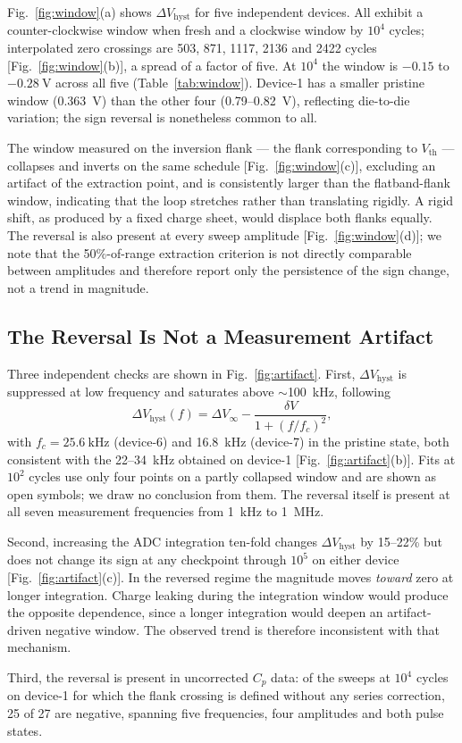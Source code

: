 \documentclass[journal]{IEEEtran}
\newcommand{\rev}[1]{#1}                    %
\newcommand{\Vth}{V_{\mathrm{th}}}
\newcommand{\dVh}{\Delta V_{\mathrm{hyst}}}
\begin{document}
\rev{Fig.~\ref{fig:window}(a) shows $\dVh$ for five independent devices.
All exhibit a counter-clockwise window when fresh and a clockwise window
by $10^4$ cycles; interpolated zero crossings are 503, 871, 1117, 2136
and 2422 cycles [Fig.~\ref{fig:window}(b)], a spread of a factor of
five. At $10^4$ the window is $-0.15$ to $-\SI{0.28}{\volt}$ across all
five (Table~\ref{tab:window}). Device-1 has a smaller pristine window
(\SI{0.363}{\volt}) than the other four (0.79--\SI{0.82}{\volt}),
reflecting die-to-die variation; the sign reversal is nonetheless common
to all.}

\rev{The window measured on the inversion flank --- the flank
corresponding to $\Vth$ --- collapses and inverts on the same schedule
[Fig.~\ref{fig:window}(c)], excluding an artifact of the extraction
point, and is consistently larger than the flatband-flank window,
indicating that the loop stretches rather than translating rigidly. A
rigid shift, as produced by a fixed charge sheet, would displace both
flanks equally. The reversal is also present at every sweep amplitude
[Fig.~\ref{fig:window}(d)]; we note that the 50\%-of-range extraction
criterion is not directly comparable between amplitudes and therefore
report only the persistence of the sign change, not a trend in
magnitude.}

\rev{\subsection{The Reversal Is Not a Measurement Artifact}
Three independent checks are shown in Fig.~\ref{fig:artifact}. First,
$\dVh$ is suppressed at low frequency and saturates above
$\sim$\SI{100}{\kilo\hertz}, following}
\begin{equation}
\dVh(f) = \Delta V_\infty - \frac{\delta V}{1+(f/f_c)^{2}},
\label{eq:debye}
\end{equation}
\rev{with $f_c=\SI{25.6}{\kilo\hertz}$ (device-6) and
\SI{16.8}{\kilo\hertz} (device-7) in the pristine state, both consistent
with the 22--\SI{34}{\kilo\hertz} obtained on device-1
[Fig.~\ref{fig:artifact}(b)]. Fits at $10^2$ cycles use only four points
on a partly collapsed window and are shown as open symbols; we draw no
conclusion from them. The reversal itself is present at all seven
measurement frequencies from \SI{1}{\kilo\hertz} to \SI{1}{\mega\hertz}.

Second, increasing the ADC integration ten-fold changes $\dVh$ by
15--22\% but does not change its sign at any checkpoint through $10^5$
on either device [Fig.~\ref{fig:artifact}(c)]. In the reversed regime
the magnitude moves \emph{toward} zero at longer integration. Charge
leaking during the integration window would produce the opposite
dependence, since a longer integration would deepen an artifact-driven
negative window. The observed trend is therefore inconsistent with that
mechanism.

Third, the reversal is present in uncorrected $C_p$ data: of the sweeps
at $10^4$ cycles on device-1 for which the flank crossing is defined
without any series correction, 25 of 27 are negative, spanning five
frequencies, four amplitudes and both pulse states.}
\end{document}
